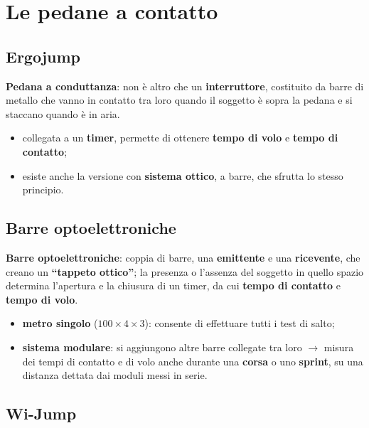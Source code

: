 \section{Le pedane a contatto}

\subsection{Ergojump}

\textbf{Pedana a conduttanza}: non è altro che un \textbf{interruttore}, costituito da barre di
metallo che vanno in contatto tra loro quando il soggetto è sopra la pedana e si staccano quando è
in aria.
\begin{itemize}
  \item collegata a un \textbf{timer}, permette di ottenere \textbf{tempo di volo} e \textbf{tempo
    di contatto};
  \item esiste anche la versione con \textbf{sistema ottico}, a barre, che sfrutta lo stesso
    principio.
\end{itemize}

\subsection{Barre optoelettroniche}

\textbf{Barre optoelettroniche}: coppia di barre, una \textbf{emittente} e una \textbf{ricevente},
che creano un \textbf{``tappeto ottico''}; la presenza o l'assenza del soggetto in quello spazio
determina l'apertura e la chiusura di un timer, da cui \textbf{tempo di contatto} e \textbf{tempo
di volo}.

\begin{itemize}
  \item \textbf{metro singolo} ($100 \times 4 \times 3$): consente di effettuare tutti i test di
    salto;
  \item \textbf{sistema modulare}: si aggiungono altre barre collegate tra loro $\rightarrow$
    misura dei tempi di contatto e di volo anche durante una \textbf{corsa} o uno \textbf{sprint},
    su una distanza dettata dai moduli messi in serie.
\end{itemize}

\subsection{Wi-Jump}

